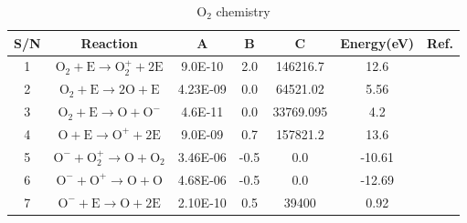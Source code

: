 \documentclass[a4paper,12pt]{article}
\begin{document}
\begin{table}[h] \centering
	\caption{$\mathrm{O_2}$ chemistry}
	\begin{tabular}{|c|c|c|c|c|c|c|}
	\hline
	S/N & Reaction & A & B & C & Energy(eV) & Ref. \\
	\hline
	1  & $\mathrm{O_2 + E     \rightarrow O_2^+ + 2E}$  & 9.0E-10    &  2.0   &  146216.7   & 12.6  &\cite{Ochem}\\
	2  & $\mathrm{O_2 + E     \rightarrow 2 O +    E}$  & 4.23E-09   &  0.0   &  64521.02  &  5.56  &\cite{Ochem}\\
	3  & $\mathrm{O_2 + E     \rightarrow   O +  O^-}$  & 4.6E-11    &  0.0   &  33769.095 &  4.2   &\cite{Ochem,Ochemd}\\
	4  & $\mathrm{O   + E     \rightarrow  O^+ +  2E}$  & 9.0E-09    &  0.7   &  157821.2  &  13.6  &\cite{Ochem,Ochemd}\\
	5  & $\mathrm{O^- + O_2^+ \rightarrow  O   + O_2}$  & 3.46E-06	 & -0.5   &  0.0       & -10.61 &\cite{Ochemd}\\
	6  & $\mathrm{O^- + O^+   \rightarrow  O   + O  }$  & 4.68E-06   & -0.5   &  0.0       & -12.69 &\cite{Ochemd}\\
	7  & $\mathrm{O^- + E     \rightarrow  O   + 2E }$  & 2.10E-10   &  0.5   &  39400     & 0.92   &\cite{Ochemd}\\
	\hline
	\end{tabular}
\end{table}




\end{document}
